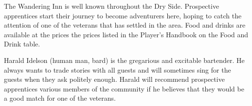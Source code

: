 The Wandering Inn is well known throughout the Dry Side.
Prospective apprentices start their journey to become adventurers here, hoping to catch the attention of one of the veterans that has settled in the area.
Food and drinks are available at the prices the prices listed in the Player's Handbook on the Food and Drink table.

Harald Idelson (human man, bard) is the gregarious and excitable bartender.
He always wants to trade stories with all guests and will sometimes sing for the guests when they ask politely enough.
Harald will recommend prospective apprentices various members of the community if he believes that they would be a good match for one of the veterans.
